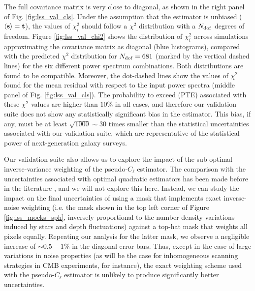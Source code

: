 \documentclass[usenatbib]{mnrasb}
\begin{document}
      The full covariance matrix is very close to diagonal, as shown in the right panel of Fig. \ref{fig:lss_val_cls}. Under the assumption that the estimator is unbiased ($\langle{\bf s}\rangle={\bf t}$), the values of $\chi^2_i$ should follow a $\chi^2$ distribution with a $N_{\rm dof}$ degrees of freedom. Figure \ref{fig:lss_val_chi2} shows the distribution of $\chi^2_i$ across simulations approximating the covariance matrix as diagonal (blue histograms), compared with the predicted $\chi^2$ distribution for $N_{\rm dof}=681$ (marked by the vertical dashed lines) for the six different power spectrum combinations. Both distributions
      are found to be compatible. Moreover, the dot-dashed lines show the values of $\chi^2$ found for the mean residual with respect to the input power spectra (middle panel of Fig. \ref{fig:lss_val_cls}). The probability to exceed (PTE) associated with these $\chi^2$ values are higher than $10\%$ in all cases, and therefore our validation suite does not show any statistically significant bias in the estimator. This bias, if any, must be at least $\sqrt{1000}\sim30$ times smaller than the statistical uncertainties associated with our validation suite, which are representative of the statistical power of next-generation galaxy surveys.
      
      Our validation suite also allows us to explore the impact of the sub-optimal inverse-variance weighting of the pseudo-$C_\ell$ estimator. The comparison with the uncertainties associated with optimal quadratic estimators has been made before in the literature \citep{2013MNRAS.435.1857L}, and we will not explore this here. Instead, we can study the impact on the final uncertainties of using a mask that implements exact inverse-noise weighting (i.e. the mask shown in the top left corner of Figure \ref{fig:lss_mocks_sph}, inversely proportional to the number density variations induced by stars and depth fluctuations) against a top-hat mask that weights all pixels equally. Repeating our analysis for the latter mask, we observe a negligible increase of $\sim0.5-1\%$ in the diagonal error bars. Thus, except in the case of large variations in noise properties (as will be the case for inhomogeneous scanning strategies in CMB experiments, for instance), the exact weighting scheme used with the pseudo-$C_\ell$ estimator is unlikely to produce significantly better uncertainties.
\end{document}
